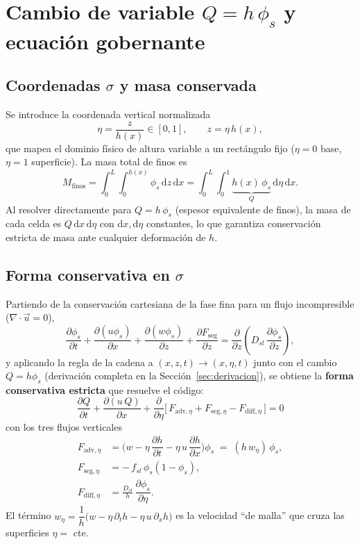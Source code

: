 \documentclass[11pt,a4paper]{article}
\newcommand{\dd}{\mathrm{d}}
\newcommand{\pd}[2]{\dfrac{\partial #1}{\partial #2}}
\begin{document}
\section{Cambio de variable $Q=h\,\phi_s$ y ecuación gobernante}
\label{sec:cambio}
\subsection{Coordenadas $\sigma$ y masa conservada}
Se introduce la coordenada vertical normalizada
\begin{equation}
    \eta = \frac{z}{h(x)} \in [0,1], \qquad z=\eta\,h(x),
\end{equation}
que mapea el dominio físico de altura variable a un rectángulo fijo
($\eta=0$ base, $\eta=1$ superficie). La masa total de finos es
\begin{equation}
    M_{\mathrm{finos}} = \int_0^L\!\!\int_0^{h(x)} \phi_s\,\dd z\,\dd x
    = \int_0^L\!\!\int_0^1 \underbrace{h(x)\,\phi_s}_{\textstyle Q}\,\dd\eta\,\dd x .
\end{equation}
Al resolver directamente para $Q=h\,\phi_s$ (espesor equivalente de finos),
la masa de cada celda es $Q\,\dd x\,\dd\eta$ con $\dd x,\dd\eta$
constantes, lo que garantiza conservación estricta de masa ante cualquier
deformación de $h$.

\subsection{Forma conservativa en $\sigma$}
Partiendo de la conservación cartesiana de la fase fina para un flujo
incompresible ($\nabla\cdot\vec u=0$),
\begin{equation}
    \pd{\phi_s}{t} + \pd{(u\phi_s)}{x} + \pd{(w\phi_s)}{z}
    + \pd{F_{\mathrm{seg}}}{z}
    = \pd{}{z}\!\left(D_{sl}\,\pd{\phi_s}{z}\right),
    \label{eq:cart}
\end{equation}
y aplicando la regla de la cadena a $(x,z,t)\to(x,\eta,t)$ junto con el
cambio $Q=h\phi_s$ (derivación completa en la Sección~\ref{sec:derivacion}),
se obtiene la \textbf{forma conservativa estricta} que resuelve el código:
\begin{equation}
    \boxed{\;\pd{Q}{t} + \pd{(u\,Q)}{x}
    + \pd{}{\eta}\Big[\, F_{\mathrm{adv},\eta} + F_{\mathrm{seg},\eta} - F_{\mathrm{diff},\eta} \,\Big] = 0\;}
    \label{eq:conservativa}
\end{equation}
con los tres flujos verticales
\begin{align}
    F_{\mathrm{adv},\eta} &= \Big(w - \eta\,\pd{h}{t} - \eta\,u\,\pd{h}{x}\Big)\phi_s \;=\; (h\,w_\eta)\,\phi_s , \label{eq:Fadv}\\
    F_{\mathrm{seg},\eta} &= -\,f_{sl}\,\phi_s(1-\phi_s), \label{eq:Fseg}\\
    F_{\mathrm{diff},\eta} &= \frac{D_{sl}}{h}\,\pd{\phi_s}{\eta}. \label{eq:Fdiff}
\end{align}
El término $w_\eta = \dfrac{1}{h}\big(w - \eta\,\partial_t h - \eta\,u\,\partial_x h\big)$
es la velocidad ``de malla'' que cruza las superficies $\eta=$ cte.
\end{document}
